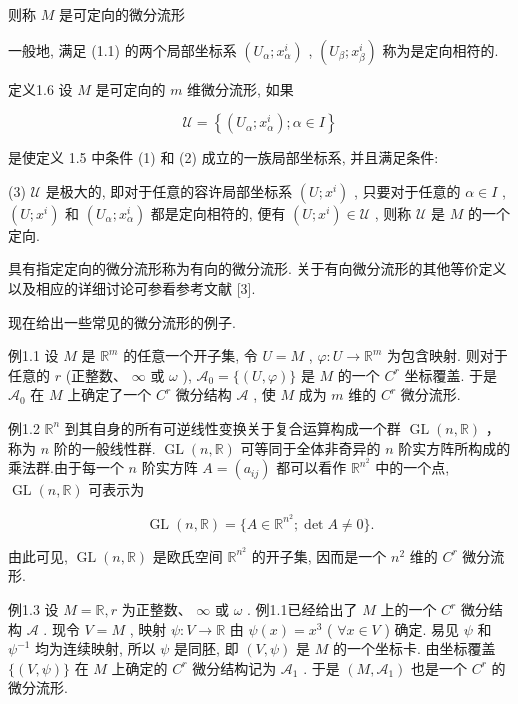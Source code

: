 则称  $M$  是可定向的微分流形

一般地, 满足 (1.1) 的两个局部坐标系  $(U_{\alpha}; x_{\alpha}^{i})$ ,  $(U_{\beta}; x_{\beta}^{i})$  称为是定向相符的.

定义1.6 设  $M$  是可定向的  $m$  维微分流形, 如果

$$
\mathscr {U} = \left\{\left(U _ {\alpha}; x _ {\alpha} ^ {i}\right); \alpha \in I \right\}
$$

是使定义 1.5 中条件 (1) 和 (2) 成立的一族局部坐标系, 并且满足条件:

(3)  $\mathcal{U}$  是极大的, 即对于任意的容许局部坐标系  $(U; x^i)$ , 只要对于任意的  $\alpha \in I$ ,  $(U; x^i)$  和  $(U_\alpha; x_\alpha^i)$  都是定向相符的, 便有  $(U; x^i) \in \mathcal{U}$ , 则称  $\mathcal{U}$  是  $M$  的一个定向.

具有指定定向的微分流形称为有向的微分流形. 关于有向微分流形的其他等价定义以及相应的详细讨论可参看参考文献 [3].

现在给出一些常见的微分流形的例子.

例1.1 设  $M$  是  $\mathbb{R}^m$  的任意一个开子集, 令  $U = M$ ,  $\varphi: U \to \mathbb{R}^m$  为包含映射. 则对于任意的  $r$  (正整数、 $\infty$  或  $\omega$ ),  $\mathcal{A}_0 = \{(U, \varphi)\}$  是  $M$  的一个  $C^r$  坐标覆盖. 于是  $\mathcal{A}_0$  在  $M$  上确定了一个  $C^r$  微分结构  $\mathcal{A}$ , 使  $M$  成为  $m$  维的  $C^r$  微分流形.

例1.2  $\mathbb{R}^n$  到其自身的所有可逆线性变换关于复合运算构成一个群  $\operatorname {GL}(n,\mathbb{R})$  ，称为  $n$  阶的一般线性群.  $\operatorname {GL}(n,\mathbb{R})$  可等同于全体非奇异的  $n$  阶实方阵所构成的乘法群.由于每一个  $n$  阶实方阵  $A = (a_{ij})$  都可以看作  $\mathbb{R}^{n^2}$  中的一个点,  $\operatorname {GL}(n,\mathbb{R})$  可表示为

$$
\operatorname {G L} (n, \mathbb {R}) = \{A \in \mathbb {R} ^ {n ^ {2}}; \det  A \neq 0 \}.
$$

由此可见,  $\operatorname{GL}(n, \mathbb{R})$  是欧氏空间  $\mathbb{R}^{n^2}$  的开子集, 因而是一个  $n^2$  维的  $C^r$  微分流形.

例1.3 设  $M = \mathbb{R}, r$  为正整数、 $\infty$  或  $\omega$ . 例1.1已经给出了  $M$  上的一个  $C^r$  微分结构  $\mathcal{A}$ . 现令  $V = M$ , 映射  $\psi : V \to \mathbb{R}$  由  $\psi(x) = x^3$  ( $\forall x \in V$ ) 确定. 易见  $\psi$  和  $\psi^{-1}$  均为连续映射, 所以  $\psi$  是同胚, 即  $(V, \psi)$  是  $M$  的一个坐标卡. 由坐标覆盖  $\{(V, \psi)\}$  在  $M$  上确定的  $C^r$  微分结构记为  $\mathcal{A}_1$ . 于是  $(M, \mathcal{A}_1)$  也是一个  $C^r$  的微分流形.

